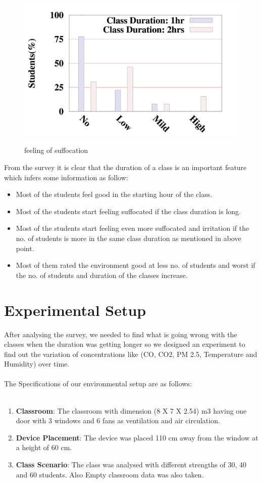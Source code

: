 \begin{figure}
\centering
\includegraphics[width=1.0\textwidth]{./suffocation_1hr_2hrs}\\[0.1in]
\label{fig:feeling of suffocation}
\caption{feeling of suffocation}
\end{figure}

From the survey it is clear that the duration of a class is an important feature which infers some information as follow:
\begin{itemize}
	\item Most of the students feel good in the starting hour of the class.
	\item Most of the students start feeling suffocated if the class duration is long.
	\item Most of the students start feeling even more suffocated and irritation if the no. of students is more in the same class duration as mentioned in above point.
	\item Most of them rated the environment good at less no. of students and worst if the no. of students and duration of the classes increase.
\end{itemize}

\section{Experimental Setup}
After analysing the survey, we needed to find what is going wrong with the classes when the duration was getting longer so we designed an experiment to find out the variation of concentrations like (CO, CO2, PM 2.5, Temperature and Humidity) over time.
\\
\\
The Specifications of our environmental setup are as follows:
\\
\\
\begin{enumerate}
	\item \textbf{Classroom}: The classroom with dimension (8 X 7 X 2.54) m3 having one door with 3 windows and 6 fans as ventilation and air circulation.
	\item \textbf{Device Placement}: The device was placed 110 cm away from the window at a height of 60 cm.
	\item \textbf{Class Scenario}: The class was analysed with different strengths of 30, 40 and 60 students. Also Empty classroom data was also taken. 
\end{enumerate}

